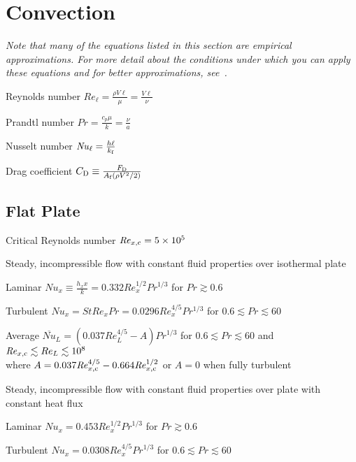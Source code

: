 \documentclass{article}
\begin{document}
\section{Convection}
\label{sec:convection}

\emph{Note that many of the equations listed in this section are empirical approximations. For more
  detail about the conditions under which you can apply these equations and for better
  approximations, see~\cite{hamt}.}

\begin{description*}
\item[Reynolds number]
  \(\mathit{Re}_\ell = \frac{\rho{}V\ell}{\mu} = \frac{V\ell}{\nu}\)
\item[Prandtl number]
  \(\mathit{Pr} = \frac{c_p\mu}{k} = \frac{\nu}{a}\)
\item[Nusselt number]
  \(\mathit{Nu}_\ell = \frac{h\ell}{k_{\mathrm{f}}}\)
\item[Drag coefficient]
  \(C_{\mathrm{D}} \equiv \frac{F_{\mathrm{D}}}{A_{\mathrm{f}}(\rho V^2/2)}\)
\end{description*}

\subsection{Flat Plate}
\begin{description*}
\item[Critical Reynolds number]
  \(\mathit{Re}_{x,\mathrm{c}} = \num{5e5}\)
\item[Steady, incompressible flow with constant fluid properties over isothermal plate]~
  \begin{description*}
  \item[Laminar]
    \(\mathit{Nu}_x \equiv \frac{h_x x}{k} = 0.332\mathit{Re}_x^{1/2}\mathit{Pr}^{1/3}\) for
    \(\mathit{Pr} \gtrsim 0.6\)
  \item[Turbulent]
    \(\mathit{Nu}_x = \mathit{St}\mathit{Re}_x\mathit{Pr} = 0.0296\mathit{Re}_x^{4/5}Pr^{1/3}\) for
    \(0.6 \lesssim \mathit{Pr} \lesssim 60\)
  \item[Average]
    \(\overline{\mathit{Nu}}_L = (0.037\mathit{Re}_L^{4/5} - A)\mathit{Pr}^{1/3}\) for
    \(0.6 \lesssim \mathit{Pr} \lesssim 60\) and
    \(\mathit{Re}_{x,\mathrm{c}} \lesssim Re_L \lesssim 10^8\) \\
    where \(A = 0.037\mathit{Re}_{x,\mathrm{c}}^{4/5} - 0.664\mathit{Re}_{x,\mathrm{c}}^{1/2}\)
    or \(A = 0\) when fully turbulent
  \end{description*}
\item[Steady, incompressible flow with constant fluid properties over plate with constant heat flux]~
  \begin{description*}
  \item[Laminar]
    \(\mathit{Nu}_x = 0.453\mathit{Re}_x^{1/2}\mathit{Pr}^{1/3}\) for \(\mathit{Pr} \gtrsim 0.6\)
  \item[Turbulent]
    \(\mathit{Nu}_x = 0.0308\mathit{Re}_x^{4/5}\mathit{Pr}^{1/3}\) for \(0.6 \lesssim \mathit{Pr} \lesssim 60\)
  \end{description*}
\end{description*}
\end{document}
